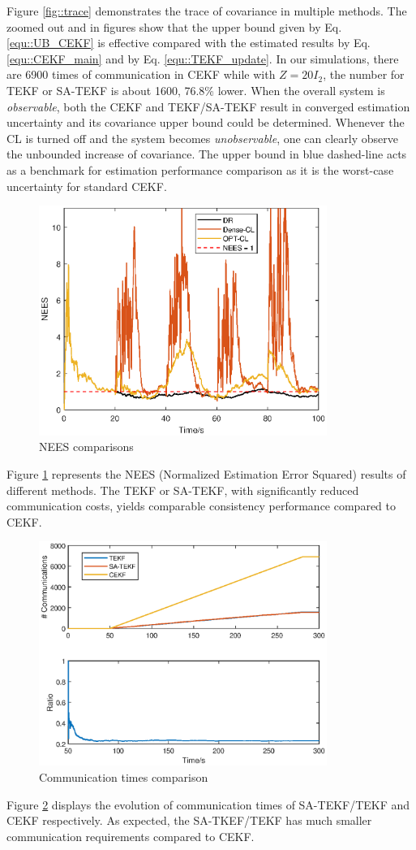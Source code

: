 \documentclass[conference]{IEEEtran}
\begin{document}
Figure \ref{fig::trace} demonstrates the trace of covariance in multiple methods.
The zoomed out and in figures show that the upper bound given by Eq. \eqref{equ::UB_CEKF} is effective compared with the estimated results by Eq. \eqref{equ::CEKF_main} and by Eq. \eqref{equ::TEKF_update}.
In our simulations, there are 6900 times of communication in CEKF while with $Z = 20I_{2}$, the number for TEKF or SA-TEKF is about 1600, 76.8\% lower.
When the overall system is \emph{observable}, both the CEKF and TEKF/SA-TEKF result in converged estimation uncertainty and its covariance upper bound could be determined. Whenever the CL is turned off and the system becomes \emph{unobservable}, one can clearly observe the unbounded increase of covariance.
The upper bound in blue dashed-line acts as a benchmark for estimation performance comparison as it is the worst-case uncertainty for standard CEKF.
\begin{figure}
	\centering
	\includegraphics[width=3.7in]{Fig/fig5_nees.eps}
	\caption{NEES comparisons}
	\label{fig::nees}
\end{figure}

Figure \ref{fig::nees} represents the NEES (Normalized Estimation Error Squared) results of different methods. The TEKF or SA-TEKF, with significantly reduced communication costs, yields comparable consistency performance compared to CEKF.

\begin{figure}
	\centering
	\includegraphics[width=3.7in]{Fig/fig6_com.eps}
	\caption{Communication times comparison}
	\label{fig::com}
\end{figure}
Figure \ref{fig::com} displays the evolution of communication times of SA-TEKF/TEKF and CEKF respectively.
As expected, the SA-TKEF/TEKF has much smaller communication requirements compared to CEKF.
\end{document}

